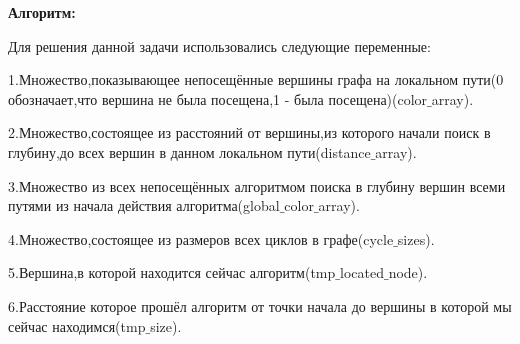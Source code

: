\documentclass[a4paper,11pt]{article}
\begin{document}
\begin{flushleft}
\textbf{Алгоритм:}

Для решения данной задачи использовались следующие переменные: 

1.Множество,показывающее непосещённые вершины графа на локальном пути(0 обозначает,что вершина не была посещена,1 - была посещена)(color$\_$array). 

2.Множество,состоящее из расстояний от вершины,из которого начали поиск в глубину,до всех вершин в данном локальном пути(distance$\_$array).

3.Множество из всех непосещённых алгоритмом поиска в глубину вершин всеми путями из начала действия алгоритма(global$\_$color$\_$array).

4.Множество,состоящее из размеров всех циклов в графе(cycle$\_$sizes).

5.Вершина,в которой находится сейчас алгоритм(tmp$\_$located$\_$node).

6.Расстояние которое прошёл алгоритм от точки начала до вершины в которой мы сейчас находимся(tmp$\_$size).




\end{flushleft}
\end{document}
